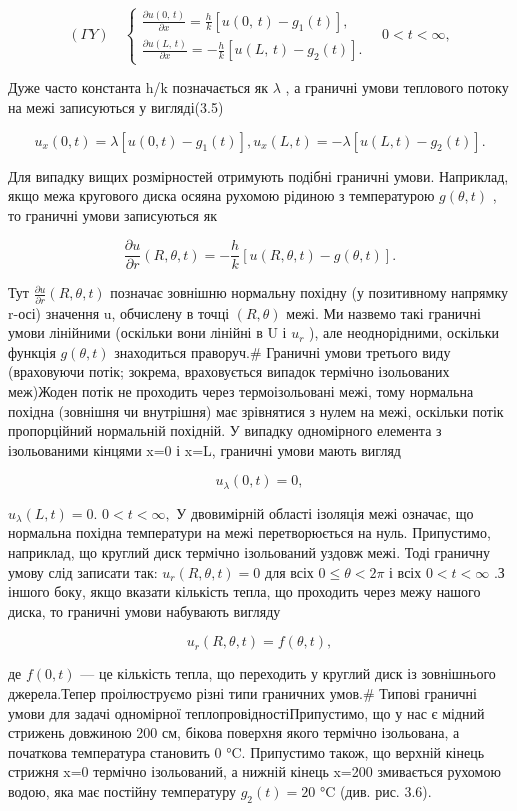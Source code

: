 \documentclass[
  ukrainian,
]{article}
\begin{document}
\[
(\Gamma Y) \quad \begin{cases} \frac{\partial u\left(0,\,t\right)}{\partial x} = \frac{h}{k}\left[u\left(0,\,t\right) - g_{1}\left(t\right)\right], \\ \frac{\partial u\left(L,\,t\right)}{\partial x} = -\frac{h}{k}\left[u\left(L,\,t\right) - g_{2}\left(t\right)\right]. \end{cases} \quad 0 < t < \infty,
\]

Дуже часто константа h/k позначається як \(\lambda\) , а граничні умови
теплового потоку на межі записуються у вигляді(3.5)

\[
u_{x}(0, t) = \lambda [u(0, t) - g_{1}(t)], u_{x}(L, t) = -\lambda [u(L, t) - g_{2}(t)].
\]

Для випадку вищих розмірностей отримують подібні граничні умови.
Наприклад, якщо межа кругового диска осяяна рухомою рідиною з
температурою \(g(\theta,t)\) , то граничні умови записуються як

\[
\frac{\partial u}{\partial r}(R, \theta, t) = -\frac{h}{k} [u(R, \theta, t) - g(\theta, t)].
\]

Тут \(\frac{\partial u}{\partial r}(R, \theta, t)\) позначає зовнішню
нормальну похідну (у позитивному напрямку r-осі) значення u, обчислену в
точці \((R, \theta)\) межі. Ми назвемо такі граничні умови лінійними
(оскільки вони лінійні в U і \(u_r\) ), але неоднорідними, оскільки
функція \(g(\theta, t)\) знаходиться праворуч.\# Граничні умови третього
виду (враховуючи потік; зокрема, враховується випадок термічно
ізольованих меж)Жоден потік не проходить через термоізольовані межі,
тому нормальна похідна (зовнішня чи внутрішня) має зрівнятися з нулем на
межі, оскільки потік пропорційний нормальній похідній. У випадку
одномірного елемента з ізольованими кінцями x=0 і x=L, граничні умови
мають вигляд

\[
u_{\lambda}(0, t) = 0,
\]

\(u_{\lambda}(L, t) = 0.\) \(0 < t < \infty,\) У двовимірній області
ізоляція межі означає, що нормальна похідна температури на межі
перетворюється на нуль. Припустимо, наприклад, що круглий диск термічно
ізольований уздовж межі. Тоді граничну умову слід записати так:
\(u_r(R, \theta, t) = 0\) для всіх \(0 \le \theta < 2\pi\) і всіх
\(0 < t < \infty\) .З іншого боку, якщо вказати кількість тепла, що
проходить через межу нашого диска, то граничні умови набувають вигляду

\[
u_r(R, \theta, t) = f(\theta, t),
\]

де \(f(0, t)\) --- це кількість тепла, що переходить у круглий диск із
зовнішнього джерела.Тепер проілюструємо різні типи граничних умов.\#
Типові граничні умови для задачі одномірної теплопровідностіПрипустимо,
що у нас є мідний стрижень довжиною 200 см, бікова поверхня якого
термічно ізольована, а початкова температура становить 0 °C. Припустимо
також, що верхній кінець стрижня x=0 термічно ізольований, а нижній
кінець x=200 змивається рухомою водою, яка має постійну температуру
\(g_2(t)=20\) °C (див. рис. 3.6).
\end{document}
